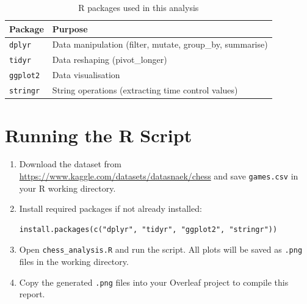\documentclass[12pt,a4paper]{article}
\begin{document}
\begin{table}[H]
\centering
\begin{tabular}{ll}
\toprule
\textbf{Package} & \textbf{Purpose} \\
\midrule
\texttt{dplyr}   & Data manipulation (filter, mutate, group\_by, summarise) \\
\texttt{tidyr}   & Data reshaping (pivot\_longer) \\
\texttt{ggplot2} & Data visualisation \\
\texttt{stringr} & String operations (extracting time control values) \\
\bottomrule
\end{tabular}
\caption{R packages used in this analysis}
\end{table}

\section{Running the R Script}

\begin{enumerate}
    \item Download the dataset from \url{https://www.kaggle.com/datasets/datasnaek/chess} and save \texttt{games.csv} in your R working directory.
    \item Install required packages if not already installed:
    \begin{verbatim}
install.packages(c("dplyr", "tidyr", "ggplot2", "stringr"))
    \end{verbatim}
    \item Open \texttt{chess\_analysis.R} and run the script. All plots will be saved as \texttt{.png} files in the working directory.
    \item Copy the generated \texttt{.png} files into your Overleaf project to compile this report.
\end{enumerate}
\end{document}
